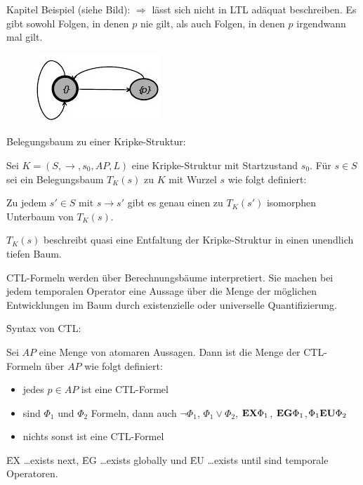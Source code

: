 \begin{chapter}{Kapitel}
\noindent Beispiel (siehe Bild): $\Rightarrow$ lässt sich nicht in LTL adäquat beschreiben. Es gibt sowohl Folgen, in denen $p$ nie gilt, als auch Folgen, in denen $p$ 
irgendwann mal gilt. 

\begin{figure}[!ht]
 \centering
 \includegraphics{pics/ctl}
\end{figure}

\f{Belegungsbaum zu einer Kripke-Struktur}:
\vspace*{4pt}

\noindent Sei $K=(S,\rightarrow,s_0,AP,L)$ eine Kripke-Struktur mit Startzustand $s_0$. Für $s\in S$ sei ein Belegungsbaum $T_K(s)$ zu $K$ mit Wurzel $s$ wie folgt
definiert: 
\vspace*{4pt}

\noindent Zu jedem $s'\in S$ mit $s\rightarrow s'$ gibt es genau einen zu $T_K(s')$ isomorphen Unterbaum von $T_K(s)$. 
\vspace*{4pt}

\noindent $T_K(s)$ beschreibt quasi eine Entfaltung der Kripke-Struktur in einen unendlich tiefen Baum. 
\vspace*{5pt}

\noindent CTL-Formeln werden über Berechnungsbäume interpretiert. Sie machen bei jedem temporalen Operator eine Aussage über die Menge der möglichen 
Entwicklungen im Baum durch existenzielle oder universelle Quantifizierung.
\vspace*{5pt}

\f{Syntax von CTL}:
\vspace*{4pt}

\noindent Sei $AP$ eine Menge von atomaren Aussagen. Dann ist die Menge der CTL-Formeln über $AP$ wie folgt definiert: 
\begin{itemize}
 \item jedes $p\in AP$ ist eine CTL-Formel
 \item sind $\Phi_1$ und $\Phi_2$ Formeln, dann auch $\neg\Phi_1$, $\Phi_1 \vee\Phi_2$, $\f{EX}\Phi_1$, $\f{EG}\Phi_1$,$\Phi_1\f{EU}\Phi_2$
 \item nichts sonst ist eine CTL-Formel
\end{itemize}
\f{EX} \dots exists next, \f{EG} \dots exists globally und \f{EU} \dots exists until sind temporale Operatoren.


\end{chapter}
